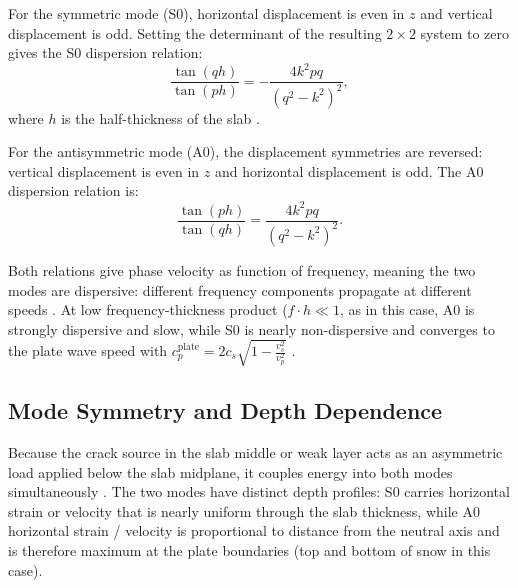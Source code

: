 For the symmetric mode (S0), horizontal displacement is even in $z$ and vertical displacement is odd. Setting the determinant of the 
resulting $2 \times 2$ system to zero gives the S0 dispersion relation:
\begin{equation}
    \frac{\tan(qh)}{\tan(ph)} = -\frac{4k^2pq}{(q^2-k^2)^2},
    \label{eq:symmetric dispersion}
\end{equation}
where $h$ is the half-thickness of the slab \parencite{suFundamentalsAnalysisLamb2009}.

For the antisymmetric mode (A0), the displacement symmetries are reversed: vertical displacement is even in $z$ and horizontal displacement is odd. The 
A0 dispersion relation is:
\begin{equation}
    \frac{\tan(ph)}{\tan(qh)} = \frac{4k^2pq}{(q^2-k^2)^2}.
    \label{eq:dispersion_asym}
\end{equation}

Both relations give phase velocity as function of frequency, meaning the two modes are dispersive: different frequency components 
propagate at different speeds \parencite{kAkiRichards19801981}. At low frequency-thickness product ($f \cdot h \ll 1$, as in this case, A0 is strongly dispersive and slow, while S0 is nearly non-dispersive and 
converges to the plate wave speed with $c_p^{\text{plate}} = 2c_s\sqrt{1 - \frac{v_s^2}{v_p^2}}$ 
\parencite{roseWavesPlates2014}.

\subsection{Mode Symmetry and Depth Dependence}

Because the crack source in the slab middle or weak layer acts as an asymmetric load applied below the slab midplane, it couples energy into both modes simultaneously \parencite{roseWavesPlates2014, achenbachWavePropagationElastic2012}. The two modes have distinct depth profiles: S0 carries horizontal strain or velocity that is nearly uniform through the slab thickness, while A0 horizontal strain / velocity is proportional to distance from the neutral axis and is therefore maximum at the plate boundaries (top and bottom of snow in this case)\parencite{graffWaveMotionElastic1975}.\par


